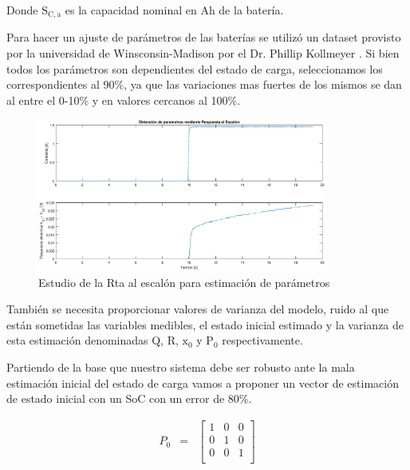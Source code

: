 \documentclass[10pt,a4paper]{article}
\begin{document}
    \noindent Donde $\mathrm{S_{C,a}}$ es la capacidad nominal en Ah de la 
    batería. 

    \noindent Para hacer un ajuste de parámetros de las baterías se utilizó un 
    dataset provisto por la universidad de Winsconsin-Madison por el 
    Dr. Phillip Kollmeyer \cite{Kollmeyer2018}. Si bien todos los parámetros 
    son dependientes del estado de carga, seleccionamos los correspondientes al 
    90\%, ya que las variaciones mas fuertes de los mismos se dan al entre el 
    0-10\% y en valores cercanos al 100\%.
	
	\begin{figure}[h!]
		\begin{center}
			\includegraphics[width=0.85\textwidth]{rta_escalon.eps}
			\caption{Estudio de la Rta al escalón para estimación de parámetros}
			\label{rta_escalon}
		\end{center}
	\end{figure}
	
	\noindent También se necesita proporcionar valores de varianza del modelo, 
    ruido al que están sometidas las variables medibles, el estado inicial 
    estimado y la varianza de esta estimación denominadas Q, R, $\mathrm{x_0}$ 
    y $\mathrm{P_0}$ respectivamente.
	
	\noindent Partiendo de la base que nuestro sistema debe ser robusto ante la 
    mala estimación inicial del estado de carga vamos a proponer un vector de 
    estimación de estado inicial con un SoC con un error de 80\%.
	
	\begin{equation}
		\begin{array}{llll}
			P_0 & = & \begin{bmatrix}
				1 & 0 & 0 \\
				0 & 1 & 0 \\
				0 & 0 & 1 \\
			\end{bmatrix} 
		\end{array} \nonumber
	\end{equation}
\end{document}
